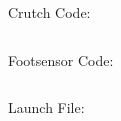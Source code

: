 \documentclass{article}
\begin{document}
Crutch Code:

\begin{lstlisting}

\end{lstlisting}

Footsensor Code:

\begin{lstlisting}

\end{lstlisting}

Launch File:

\begin{lstlisting}

\end{lstlisting}
\end{document}

